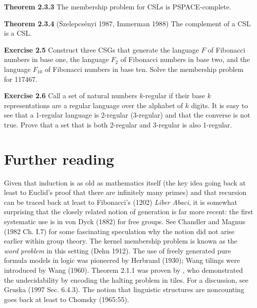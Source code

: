 {\smallskip\noindent
{\bf Theorem 2.3.3} \cite{Karp:1972} The membership problem for CSLs is
PSPACE-complete. 

\smallskip\noindent
{\bf Theorem 2.3.4}\nocite{Szelepcse1nyi:1987} (Szelepcs\'enyi 1987,
Immerman 1988)\nocite{Immerman:1988} The complement of a CSL is a CSL. 

\smallskip\noindent
{\bf Exercise 2.5} Construct three CSGs that generate the language $F$ of
Fibonacci numbers in base one, the language $F_2$ of Fibonacci numbers in base
two, and the language $F_{10}$ of Fibonacci numbers in base ten. Solve the 
membership problem for 117467.

\smallskip\noindent
{\bf Exercise 2.6} Call a set of natural numbers $k$-regular if their 
base $k$ representations are a regular language over the alphabet of $k$ 
digits. It is easy to see that a 1-regular language is 2-regular (3-regular)
and that the converse is not true. Prove that a set that is both 2-regular 
and 3-regular is also 1-regular. 


\section{Further reading}

Given that induction is as old as mathematics itself (the key idea going back
at least to Euclid's proof that there are infinitely many primes) and that
recursion can be traced back at least to Fibonacci's (1202) {\it Liber Abaci},
it is somewhat surprising that the closely related notion of generation is far
more recent: the first systematic use is in von Dyck (1882) for free
groups. See Chandler and Magnus (1982 Ch. I.7) for some fascinating
speculation why the notion did not arise earlier within group theory.  The
kernel membership problem is known as the {\it word problem} in this setting
(Dehn 1912).  The use of freely generated pure formula models in logic was
pioneered by Herbrand (1930); Wang tilings were introduced by Wang (1960).
Theorem 2.1.1 was proven by , who demonstrated the
undecidability by encoding the halting problem in tiles. For a discussion, see
Gruska (1997 Sec. 6.4.3).  The notion that linguistic structures are
noncounting goes back at least to Chomsky (1965:55). 
  \nocite{Chandler:1982} \nocite{Herbrand:1930}
\nocite{Dyck:1882} \nocite{Dehn:1912} \nocite{Wang:1960} \nocite{Gruska:1997}
\nocite{Chomsky:1965}\nocite{Fibonacci:1202}

}
